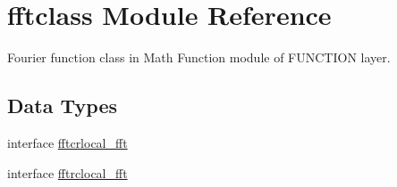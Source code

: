 \hypertarget{namespacefftclass}{}\section{fftclass Module Reference}
\label{namespacefftclass}


Fourier function class in Math Function module of F\+U\+N\+C\+T\+I\+ON layer.  


\subsection*{Data Types}
\begin{DoxyCompactItemize}
\item 
interface \mbox{\hyperlink{interfacefftclass_1_1fftcrlocal__fft}{fftcrlocal\+\_\+fft}}
\item 
interface \mbox{\hyperlink{interfacefftclass_1_1fftrclocal__fft}{fftrclocal\+\_\+fft}}
\end{DoxyCompactItemize}
